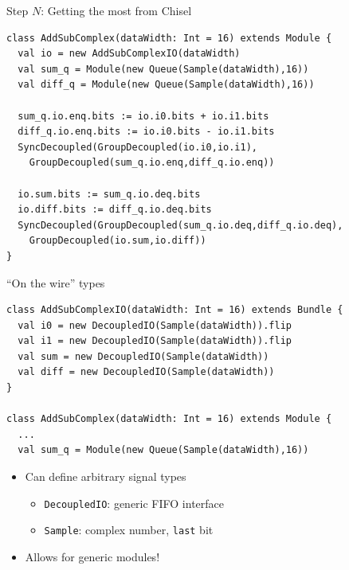 \documentclass{beamer}
\begin{document}
\begin{frame}[fragile]{Step $N$: Getting the most from Chisel}
  \small
\begin{verbatim}
class AddSubComplex(dataWidth: Int = 16) extends Module {
  val io = new AddSubComplexIO(dataWidth)
  val sum_q = Module(new Queue(Sample(dataWidth),16))
  val diff_q = Module(new Queue(Sample(dataWidth),16))

  sum_q.io.enq.bits := io.i0.bits + io.i1.bits
  diff_q.io.enq.bits := io.i0.bits - io.i1.bits
  SyncDecoupled(GroupDecoupled(io.i0,io.i1),
    GroupDecoupled(sum_q.io.enq,diff_q.io.enq))

  io.sum.bits := sum_q.io.deq.bits
  io.diff.bits := diff_q.io.deq.bits
  SyncDecoupled(GroupDecoupled(sum_q.io.deq,diff_q.io.deq),
    GroupDecoupled(io.sum,io.diff))
}
\end{verbatim}
\normalsize
\end{frame}

\begin{frame}[fragile]{``On the wire'' types}
  \small
\begin{verbatim}
class AddSubComplexIO(dataWidth: Int = 16) extends Bundle {
  val i0 = new DecoupledIO(Sample(dataWidth)).flip
  val i1 = new DecoupledIO(Sample(dataWidth)).flip
  val sum = new DecoupledIO(Sample(dataWidth))
  val diff = new DecoupledIO(Sample(dataWidth))
}

class AddSubComplex(dataWidth: Int = 16) extends Module {
  ...
  val sum_q = Module(new Queue(Sample(dataWidth),16))
\end{verbatim} 
\normalsize
  \begin{itemize}
  \item Can define arbitrary signal types
    \begin{itemize}
    \item \texttt{DecoupledIO}: generic FIFO interface
    \item \texttt{Sample}: complex number, \texttt{last} bit
    \end{itemize}
  \item Allows for generic modules!
  \end{itemize}
\end{frame}
\end{document}
